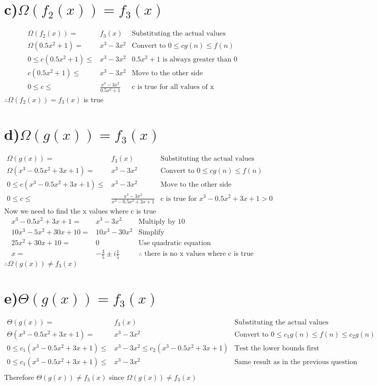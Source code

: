 \documentclass[11pt]{article}
\begin{document}
			\section*{c)$\Omega(f_2(x)) = f_3(x)$}
				\begin{align}
					\Omega(f_2(x)) =& f_3(x)&\text{Substituting the actual values}\\
					\Omega(0.5x^2+1)=&x^3-3x^2  & \text{Convert to } 0\le cg(n) \le f(n)\\
					0\le c(0.5x^2+1) \le& x^3-3x^2 & 0.5x^2+1 \text{ is always greater than 0}\\
					c(0.5x^2+1) \le& x^3-3x^2 & \text{Move to the other side}\\
					0\le c \le &\frac{x^3-3x^2}{0.5x^2+1} &\text{c is true for all values of x}
				\end{align}
				$\therefore \Omega(f_2(x)) = f_3(x)$ is true
			\section*{d)$\Omega(g(x)) = f_3(x)$}
				\begin{align}
					\Omega(g(x)) =& f_3(x)& \text{Substituting the actual values}\\
					\Omega(x^3-0.5x^2+3x+1)=&x^3-3x^2&\text{Convert to } 0\le cg(n) \le f(n)\\
					0 \le c(x^3-0.5x^2+3x+1) \le& x^3-3x^2 & \text{Move to the other side}\\
					0 \le c\le&\frac{x^3-3x^2}{x^3-0.5x^2+3x+1}  &\text{c is true for } x^3-0.5x^2+3x+1>0	
				\end{align}
				Now we need to find the x values where c is true
				\begin{align}
					x^3-0.5x^2+3x+1=&x^3-3x^2 &\text{Multiply by 10}\\
					10x^3-5x^2+30x+10=&10x^3-30x^2 &\text{Simplify}\\
					25x^2+30x+10=&0 &\text{Use quadratic equation}\\
					x=&-\frac{3}{5}\pm i\frac{1}{5}&\therefore \text{ there is no x values where c is true}
				\end{align}
				$\therefore \Omega(g(x)) \ne f_3(x)$
			\section*{e)$\Theta(g(x)) = f_3(x)$}
				\begin{align}
					\Theta(g(x)) =& f_3(x)&\text{Substituting the actual values}\\
					\Theta(x^3-0.5x^2+3x+1) =& x^3-3x^2&\text{Convert to } 0\le c_1g(n) \le f(n) \le c_2 g(n)\\
					0\le c_1 (x^3-0.5x^2+3x+1) \le& x^3-3x^2 \le c_2(x^3-0.5x^2+3x+1) &\text{Test the lower bounds first}\\
					0\le c_1 (x^3-0.5x^2+3x+1) \le& x^3-3x^2 &\text{Same result  as in the previous question}\\ 
				\end{align}
				Therefore $\Theta(g(x)) \ne f_3(x)$ since $\Omega(g(x)) \ne f_3(x)$ 
\end{document}
